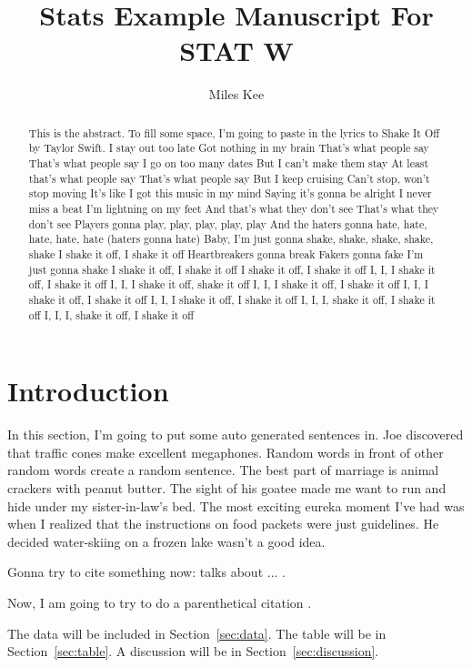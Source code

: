 \documentclass[12pt]{article}
\title{Stats Example Manuscript For STAT W}
\author{Miles Kee
}
\begin{document}
\maketitle

\begin{abstract}
This is the abstract. To fill some space, I'm going to paste in the lyrics to Shake It Off by Taylor Swift. I stay out too late Got nothing in my brain That's what people say That's what people say I go on too many dates But I can't make them stay At least that's what people say That's what people say But I keep cruising Can't stop, won't stop moving It's like I got this music in my mind Saying it's gonna be alright I never miss a beat I'm lightning on my feet And that's what they don't see That's what they don't see Players gonna play, play, play, play, play And the haters gonna hate, hate, hate, hate, hate (haters gonna hate) Baby, I'm just gonna shake, shake, shake, shake, shake I shake it off, I shake it off Heartbreakers gonna break Fakers gonna fake I'm just gonna shake I shake it off, I shake it off I shake it off, I shake it off I, I, I shake it off, I shake it off I, I, I shake it off, shake it off I, I, I shake it off, I shake it off I, I, I shake it off, I shake it off I, I, I shake it off, I shake it off I, I, I, shake it off, I shake it off I, I, I, shake it off, I shake it off
\end{abstract}

\section{Introduction}
\label{sec:intro}
In this section, I'm going to put some auto generated sentences in. Joe discovered that traffic cones make excellent megaphones. Random words in front of other random words create a random sentence. The best part of marriage is animal crackers with peanut butter. The sight of his goatee made me want to run and hide under my sister-in-law's bed. The most exciting eureka moment I've had was when I realized that the instructions on food packets were just guidelines. He decided water-skiing on a frozen lake wasn’t a good idea.

Gonna try to cite something now:
\citet{article1} talks about ... \lipsum[1].

Now, I am going to try to do a parenthetical citation \citep[][]{article2}.



The data will be included in Section~\ref{sec:data}.
The table will be in Section~\ref{sec:table}.
A discussion will be in Section~\ref{sec:discussion}.
\end{document}
